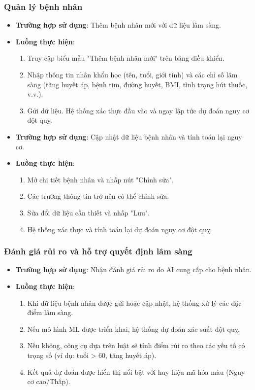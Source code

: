 ﻿\documentclass{article}
\begin{document}
\subsubsection{Quản lý bệnh nhân}
\begin{itemize}
    \item \textbf{Trường hợp sử dụng}: Thêm bệnh nhân mới với dữ liệu lâm sàng.
    \item \textbf{Luồng thực hiện}:
        \begin{enumerate}
            \item Truy cập biểu mẫu "Thêm bệnh nhân mới" trên bảng điều khiển.
            \item Nhập thông tin nhân khẩu học (tên, tuổi, giới tính) và các chỉ số lâm sàng (tăng huyết áp, bệnh tim, đường huyết, BMI, tình trạng hút thuốc, v.v.).
            \item Gửi dữ liệu. Hệ thống xác thực đầu vào và ngay lập tức dự đoán nguy cơ đột quỵ.
        \end{enumerate}
    \item \textbf{Trường hợp sử dụng}: Cập nhật dữ liệu bệnh nhân và tính toán lại nguy cơ.
    \item \textbf{Luồng thực hiện}:
        \begin{enumerate}
            \item Mở chi tiết bệnh nhân và nhấp nút "Chỉnh sửa".
            \item Các trường thông tin trở nên có thể chỉnh sửa.
            \item Sửa đổi dữ liệu cần thiết và nhấp "Lưu".
            \item Hệ thống xác thực và tính toán lại dự đoán nguy cơ đột quỵ.
        \end{enumerate}
\end{itemize}

\subsubsection{Đánh giá rủi ro và hỗ trợ quyết định lâm sàng}
\begin{itemize}
    \item \textbf{Trường hợp sử dụng}: Nhận đánh giá rủi ro do AI cung cấp cho bệnh nhân.
    \item \textbf{Luồng thực hiện}:
        \begin{enumerate}
            \item Khi dữ liệu bệnh nhân được gửi hoặc cập nhật, hệ thống xử lý các đặc điểm lâm sàng.
            \item Nếu mô hình ML được triển khai, hệ thống dự đoán xác suất đột quỵ.
            \item Nếu không, công cụ dựa trên luật sẽ tính điểm rủi ro theo các yếu tố có trọng số (ví dụ: tuổi > 60, tăng huyết áp).
            \item Kết quả dự đoán được hiển thị nổi bật với huy hiệu mã hóa màu (Nguy cơ cao/Thấp).
        \end{enumerate}
\end{itemize}
\end{document}
